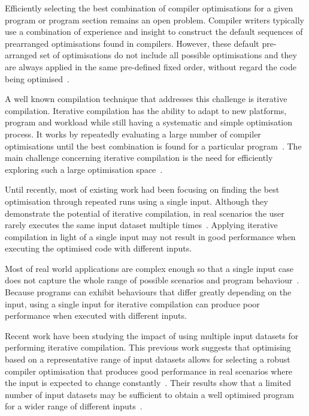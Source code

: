 \documentclass[sigplan,10pt]{acmart}
\theoremstyle{definition}
\newcommand{\itercomp}{{iterative compilation}}
\newcommand{\Itercomp}{{Iterative compilation}}
\begin{document}
Efficiently selecting the best combination of compiler optimisations for a given program or program section remains an open problem.
Compiler writers typically use a combination of experience and insight to construct the default sequences of prearranged optimisations found in compilers.
However, these default pre-arranged set of optimisations do not include all possible optimisations and they are always applied in the same pre-defined fixed order, without regard the code being optimised~\cite{pan06,cavazos07,zhou12,kulkarni12}.

A well known compilation technique that addresses this challenge is {\itercomp}.
{\Itercomp} has the ability to adapt to new platforms, program and workload while still having a systematic and simple optimisation process.
It works by repeatedly evaluating a large number of compiler optimisations until the best combination is found for a particular program~\cite{fursin07,chen10}.
The main challenge concerning {\itercomp} is the need for efficiently exploring such a large optimisation space~\cite{fursin07,cavazos07,zhou12}.

Until recently, most of existing work  had been focusing on finding the best optimisation through repeated runs using a single input.
Although they demonstrate the potential of {\itercomp}, in real scenarios the user rarely executes the same input dataset multiple times~\cite{bodin98,kisuki99,stephenson03,kulkarni04,agakov06}.
Applying {\itercomp} in light of a single input may not result in good performance when executing the optimised code with different inputs.

Most of real world applications are complex enough so that a single input case does not capture the whole range of possible scenarios and program behaviour~\cite{haneda06,fursin07,chen10,chen12a}.
Because programs can exhibit behaviours that differ greatly depending on the input,
using a single input for {\itercomp} can produce poor performance when executed with different inputs.

Recent work have been studying the impact of using multiple input datasets
for performing {\itercomp}.
This previous work suggests that optimising based on a representative range of input datasets allows for selecting a robust compiler optimisation that produces good performance in real scenarios where the input is expected to change constantly~\cite{haneda06,fursin07,chen10,chen12a,chen12b,fang15,mpeis16}.
Their results show that a limited number of input datasets may be sufficient to obtain a well optimised program for a wider range of different inputs~\cite{haneda06,fursin07,chen10,chen12a}.
\end{document}
